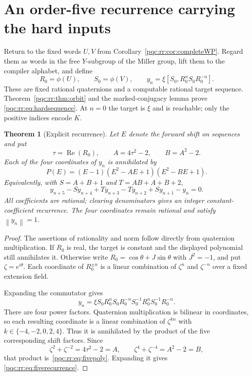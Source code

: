 \documentclass[11pt,letterpaper]{article}
\numberwithin{equation}{section}
\newtheorem{theorem}{Theorem}[section]
\theoremstyle{definition}
\theoremstyle{remark}
\newcommand{\srcmark}[1]{\par\noindent{\small\itshape [source~#1]}\par}
\newcommand{\Rea}{\operatorname{Re}}
\newcommand{\enorm}[1]{\left\lVert#1\right\rVert}
\begin{document}
\section{An order-five recurrence carrying the hard inputs}
\label{pqc:rr:sec:recurrence}
\srcmark{11}

Return to the fixed words $U,V$ from Corollary~\ref{pqc:rr:cor:completeWP}.
Regard them as words in the free $Y$-subgroup of the Miller group, lift
them to the compiler alphabet, and define
\[
 R_0=\phi(U),\qquad S_0=\phi(V),\qquad
 y_n=\xi[S_0,R_0^nS_0R_0^{-n}].
\]
These are fixed rational quaternions and a computable rational target
sequence. Theorem~\ref{pqc:rr:thm:orbit} and the marked-conjugacy lemma prove
\eqref{pqc:rr:eq:hardsequence}. At $n=0$ the target is $\xi$ and is reachable;
only the positive indices encode $K$.

\begin{theorem}[Explicit recurrence]\label{pqc:rr:thm:five}
Let $E$ denote the forward shift on sequences and put
\[
 \tau=\Rea(R_0),\qquad
 A=4\tau^2-2,\qquad B=A^2-2.
\]
Each of the four coordinates of $y_n$ is annihilated by
\begin{equation}\label{pqc:rr:eq:fivepoly}
 P(E)=(E-1)(E^2-AE+1)(E^2-BE+1).
\end{equation}
Equivalently, with $S=A+B+1$ and $T=AB+A+B+2$,
\begin{equation}\label{pqc:rr:eq:fiverecurrence}
 y_{n+5}-S y_{n+4}+T y_{n+3}-T y_{n+2}
       +S y_{n+1}-y_n=0.
\end{equation}
All coefficients are rational; clearing denominators gives an integer
constant-coefficient recurrence. The four coordinates remain rational
and satisfy $\enorm{y_n}=1$.
\end{theorem}
\begin{proof}
The assertions of rationality and norm follow directly from quaternion
multiplication. If $R_0$ is real, the target is constant and the displayed
polynomial still annihilates it. Otherwise write
$R_0=\cos\theta+J\sin\theta$ with $J^2=-1$, and put
$\zeta=e^{i\theta}$. Each coordinate of $R_0^{\pm n}$ is a linear
combination of $\zeta^n$ and $\zeta^{-n}$ over a fixed extension field.

Expanding the commutator gives
\[
 y_n=\xi S_0R_0^nS_0R_0^{-n}S_0^{-1}
             R_0^nS_0^{-1}R_0^{-n}.
\]
There are four power factors. Quaternion multiplication is bilinear in
coordinates, so each resulting coordinate is a linear combination of
$\zeta^{kn}$ with
$k\in\{-4,-2,0,2,4\}$. Thus it is annihilated by the product of the five
corresponding shift factors. Since
\[
 \zeta^2+\zeta^{-2}=4\tau^2-2=A,\qquad
 \zeta^4+\zeta^{-4}=A^2-2=B,
\]
that product is~\eqref{pqc:rr:eq:fivepoly}. Expanding it gives
\eqref{pqc:rr:eq:fiverecurrence}.
\end{proof}
\end{document}
